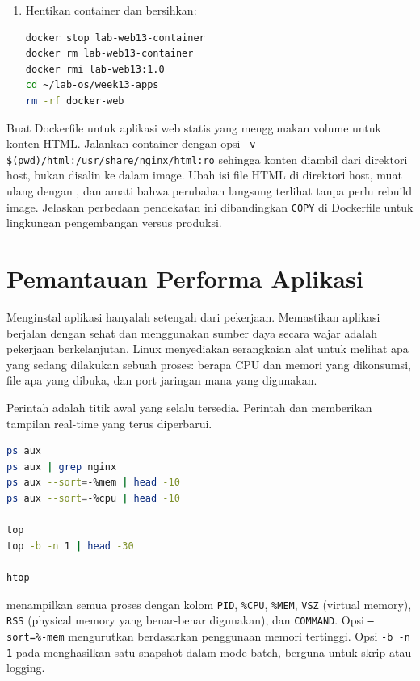 \begin{enumerate}
    \item Hentikan container dan bersihkan:
\begin{lstlisting}[language=bash, caption={Bersihkan container dan image}]
docker stop lab-web13-container
docker rm lab-web13-container
docker rmi lab-web13:1.0
cd ~/lab-os/week13-apps
rm -rf docker-web
\end{lstlisting}
\end{enumerate}

\begin{challengebox}
Buat Dockerfile untuk aplikasi web statis yang menggunakan volume untuk
konten HTML. Jalankan container dengan opsi \texttt{-v \$(pwd)/html:/usr/share/nginx/html:ro}
sehingga konten diambil dari direktori host, bukan disalin ke dalam image.
Ubah isi file HTML di direktori host, muat ulang dengan , dan amati
bahwa perubahan langsung terlihat tanpa perlu rebuild image. Jelaskan perbedaan
pendekatan ini dibandingkan \texttt{COPY} di Dockerfile untuk lingkungan
pengembangan versus produksi.
\end{challengebox}

\section{Pemantauan Performa Aplikasi}
\label{sec:app-monitoring}

Menginstal aplikasi hanyalah setengah dari pekerjaan. Memastikan aplikasi berjalan
dengan sehat dan menggunakan sumber daya secara wajar adalah pekerjaan berkelanjutan.
Linux menyediakan serangkaian alat untuk melihat apa yang sedang dilakukan sebuah
proses: berapa CPU dan memori yang dikonsumsi, file apa yang dibuka, dan port
jaringan mana yang digunakan.

Perintah  adalah titik awal yang selalu tersedia. Perintah 
dan  memberikan tampilan real-time yang terus diperbarui.

\begin{lstlisting}[language=bash, caption={Memantau proses dengan ps dan top}]
ps aux
ps aux | grep nginx
ps aux --sort=-%mem | head -10
ps aux --sort=-%cpu | head -10

top
top -b -n 1 | head -30

htop
\end{lstlisting}

 menampilkan semua proses dengan kolom \texttt{PID}, \texttt{\%CPU},
\texttt{\%MEM}, \texttt{VSZ} (virtual memory), \texttt{RSS} (physical memory
yang benar-benar digunakan), dan \texttt{COMMAND}. Opsi \texttt{--sort=\%-mem}
mengurutkan berdasarkan penggunaan memori tertinggi. Opsi \texttt{-b -n 1} pada
 menghasilkan satu snapshot dalam mode batch, berguna untuk skrip atau
logging.

